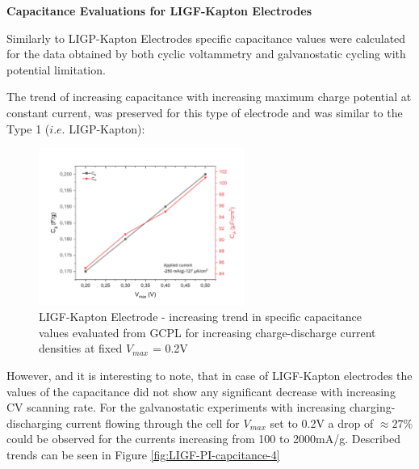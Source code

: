 \textbf{Capacitance Evaluations for LIGF-Kapton Electrodes}

Similarly to LIGP-Kapton Electrodes specific capacitance values were calculated for the data obtained by both cyclic voltammetry and galvanostatic cycling with potential limitation. 

The trend of increasing capacitance with increasing maximum charge potential at constant current,  was preserved for this type of electrode and was similar to the Type 1 ($i.e.$ LIGP-Kapton):

\begin{figure}[H]
\centering
\includegraphics[width=0.6\textwidth]{Figures/Results/Electrochemistry/LIGF-PI-NaNO3-Swagelok/Cell2/Capacitances-Vmax.jpg}
\medskip
\captionsetup{width=0.7\linewidth}
\caption{LIGF-Kapton Electrode - increasing trend in specific capacitance values evaluated from GCPL for increasing charge-discharge current densities at fixed $V_{max}$ = 0.2\:V}
\label{fig:LIGF-PI-capcitance-cc}
\end{figure}

However, and it is interesting to note, that in case of LIGF-Kapton electrodes the values of the capacitance did not show any significant decrease with increasing CV scanning rate. For the galvanostatic experiments with increasing charging-discharging current flowing through the cell for $V_{max}$ set to 0.2\:V a drop of $\approx27\%$ could be observed for the currents increasing from 100 to 2000\:mA/g. Described trends can be seen in Figure \ref{fig:LIGF-PI-capcitance-4}


